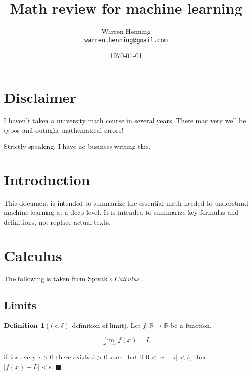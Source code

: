 \documentclass{article}
\begin{document}
\title{Math review for machine learning}
\author{Warren Henning\\\texttt{warren.henning@gmail.com}}
\date{\today}

\maketitle

\section{Disclaimer}

I haven't taken a university math course in several years. There may very well
be typos and outright mathematical errors!

Strictly speaking, I have no business writing this.

\section{Introduction}

This document is intended to summarize the essential math needed to understand
machine learning at a deep level. It is intended to summarize key formulas and
definitions, not replace actual texts.

\section{Calculus}

The following is taken from Spivak's {\it Calculus} \cite{spivak}.

\subsection{Limits}

\theoremstyle{definition}
\newtheorem{definition}{Definition}
\newtheorem{example}{Example}

\begin{definition}[$(\epsilon, \delta)$ definition of limit]

Let $f: \mathbb{R} \to \mathbb{R}$ be a function. 

\begin{equation}
\lim_{x \to a} f(x) = L
\end{equation}

if for every $\epsilon > 0$ there exists $\delta > 0$ such that if $0 < |x-a| <
\delta$, then $|f(x) - L| < \epsilon$. $\blacksquare$
 
\end{definition}
\end{document}
